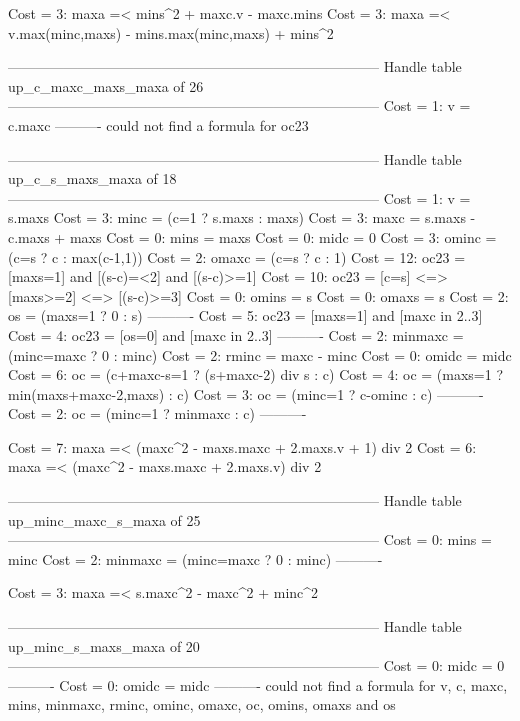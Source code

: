 Cost =  3:  maxa =< mins^2 + maxc.v - maxc.mins
Cost =  3:  maxa =< v.max(minc,maxs) - mins.max(minc,maxs) + mins^2

--------------------------------------------------------------------------------
Handle table up_c_maxc_maxs_maxa of 26
--------------------------------------------------------------------------------
Cost =  1:  v    = c.maxc
----------
could not find a formula for oc23


--------------------------------------------------------------------------------
Handle table up_c_s_maxs_maxa of 18
--------------------------------------------------------------------------------
Cost =  1:  v       = s.maxs
Cost =  3:  minc    = (c=1 ? s.maxs : maxs)
Cost =  3:  maxc    = s.maxs - c.maxs + maxs
Cost =  0:  mins    = maxs
Cost =  0:  midc    = 0
Cost =  3:  ominc   = (c=s ? c : max(c-1,1))
Cost =  2:  omaxc   = (c=s ? c : 1)
Cost = 12:  oc23    = [maxs=1] and [(s-c)=<2] and [(s-c)>=1]
Cost = 10:  oc23    = [c=s] <=> [maxs>=2] <=> [(s-c)>=3]
Cost =  0:  omins   = s
Cost =  0:  omaxs   = s
Cost =  2:  os      = (maxs=1 ? 0 : s)
----------
Cost =  5:  oc23    = [maxs=1] and [maxc in 2..3]
Cost =  4:  oc23    = [os=0] and [maxc in 2..3]
----------
Cost =  2:  minmaxc = (minc=maxc ? 0 : minc)
Cost =  2:  rminc   = maxc - minc
Cost =  0:  omidc   = midc
Cost =  6:  oc      = (c+maxc-s=1 ? (s+maxc-2) div s : c)
Cost =  4:  oc      = (maxs=1 ? min(maxs+maxc-2,maxs) : c)
Cost =  3:  oc      = (minc=1 ? c-ominc : c)
----------
Cost =  2:  oc      = (minc=1 ? minmaxc : c)
----------

Cost =  7:  maxa =< (maxc^2 - maxs.maxc + 2.maxs.v + 1) div 2
Cost =  6:  maxa =< (maxc^2 - maxs.maxc + 2.maxs.v) div 2

--------------------------------------------------------------------------------
Handle table up_minc_maxc_s_maxa of 25
--------------------------------------------------------------------------------
Cost =  0:  mins    = minc
Cost =  2:  minmaxc = (minc=maxc ? 0 : minc)
----------

Cost =  3:  maxa =< s.maxc^2 - maxc^2 + minc^2

--------------------------------------------------------------------------------
Handle table up_minc_s_maxs_maxa of 20
--------------------------------------------------------------------------------
Cost =  0:  midc    = 0
----------
Cost =  0:  omidc   = midc
----------
could not find a formula for v, c, maxc, mins, minmaxc, rminc, ominc, omaxc, oc, omins, omaxs and os



